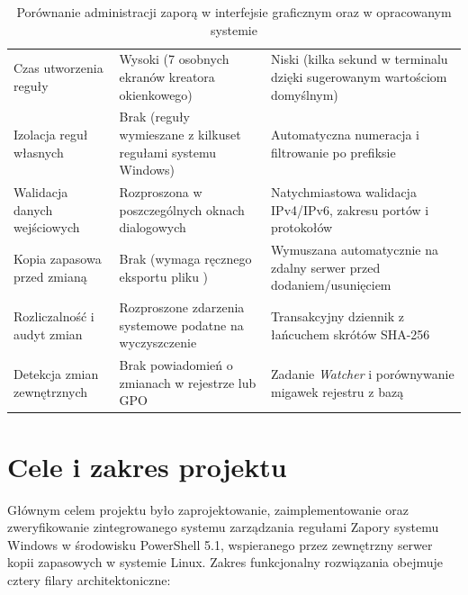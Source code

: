 \begin{table}[H]
    \centering
    \caption{Porównanie administracji zaporą w interfejsie graficznym oraz w opracowanym systemie}\label{tab:gui-vs-cli}
    \tablefont
    \begin{tabularx}{\linewidth}{L{3.6cm} Y Y}
        \toprule
         &  &  \\
        \midrule
        Czas utworzenia reguły & Wysoki (7 osobnych ekranów kreatora okienkowego) & Niski (kilka sekund w terminalu dzięki sugerowanym wartościom domyślnym) \\
        Izolacja reguł własnych & Brak (reguły wymieszane z kilkuset regułami systemu Windows) & Automatyczna numeracja i filtrowanie po prefiksie  \\
        Walidacja danych wejściowych & Rozproszona w poszczególnych oknach dialogowych & Natychmiastowa walidacja IPv4/IPv6, zakresu portów i protokołów \\
        Kopia zapasowa przed zmianą & Brak (wymaga ręcznego eksportu pliku ) & Wymuszana automatycznie na zdalny serwer przed dodaniem/usunięciem \\
        Rozliczalność i audyt zmian & Rozproszone zdarzenia systemowe podatne na wyczyszczenie & Transakcyjny dziennik  z łańcuchem skrótów SHA-256 \\
        Detekcja zmian zewnętrznych & Brak powiadomień o zmianach w rejestrze lub GPO & Zadanie \textit{Watcher} i porównywanie migawek rejestru z bazą  \\
        \bottomrule
    \end{tabularx}
\end{table}

\section{Cele i zakres projektu}\label{sec:cel-zakres}

Głównym celem projektu było zaprojektowanie, zaimplementowanie oraz zweryfikowanie zintegrowanego systemu zarządzania regułami Zapory systemu Windows w środowisku PowerShell 5.1, wspieranego przez zewnętrzny serwer kopii zapasowych w systemie Linux. Zakres funkcjonalny rozwiązania obejmuje cztery filary architektoniczne:


